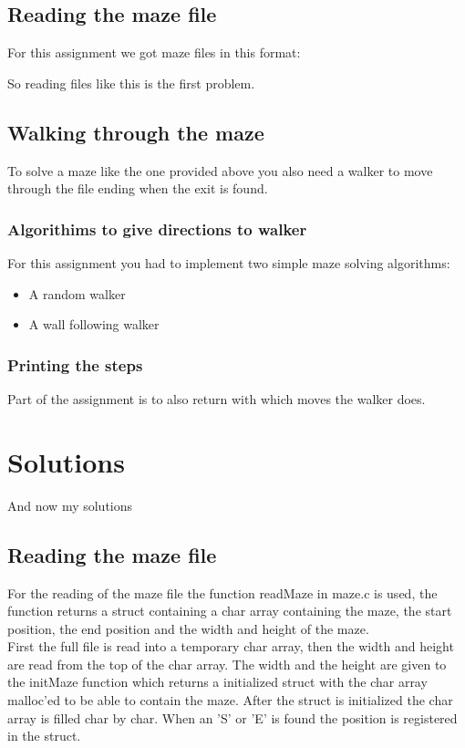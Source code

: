 \documentclass[pdftex,12pt,a4paper]{article}
\begin{document}
\subsection{Reading the maze file}
For this assignment we got maze files in this format:

So reading files like this is the first problem.
\subsection{Walking through the maze}
To solve a maze like the one provided above you also need a walker to move through the file ending when the exit is found.
\subsubsection{Algorithims to give directions to walker}
For this assignment you had to implement two simple maze solving algorithms:
\begin{itemize}
\item A random walker
\item A wall following walker
\end{itemize}
\subsubsection{Printing the steps}
Part of the assignment is to also return with which moves the walker does.

\section{Solutions}
And now my solutions 
\subsection{Reading the maze file}
For the reading of the maze file the function readMaze in maze.c is used, the function returns a struct containing a char array containing the maze, the start position, the end position and the width and height of the maze.
\\

First the full file is read into a temporary char array, then the width and height are read from the top of the char array.
The width and the height are given to the initMaze function which returns a initialized struct with the char array malloc'ed to be able to contain the maze.
After the struct is initialized the char array is filled char by char.
When an 'S' or 'E' is found the position is registered in the struct.
\end{document}
